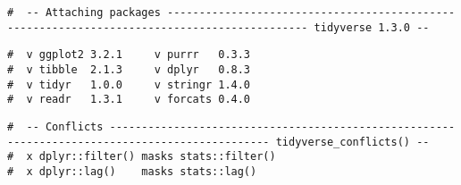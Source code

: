 \documentclass[letterpaper,9pt,twocolumn,twoside,]{pinp}
\begin{document}
\begin{ShadedResult}
\begin{verbatim}
#  -- Attaching packages -------------------------------------------------------------------------------------------- tidyverse 1.3.0 --
\end{verbatim}
\end{ShadedResult}
\begin{ShadedResult}
\begin{verbatim}
#  v ggplot2 3.2.1     v purrr   0.3.3
#  v tibble  2.1.3     v dplyr   0.8.3
#  v tidyr   1.0.0     v stringr 1.4.0
#  v readr   1.3.1     v forcats 0.4.0
\end{verbatim}
\end{ShadedResult}
\begin{ShadedResult}
\begin{verbatim}
#  -- Conflicts ----------------------------------------------------------------------------------------------- tidyverse_conflicts() --
#  x dplyr::filter() masks stats::filter()
#  x dplyr::lag()    masks stats::lag()
\end{verbatim}
\end{ShadedResult}
\end{document}
